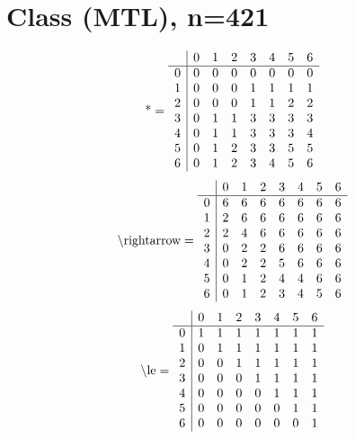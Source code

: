 \documentclass[11pt]{article}
\begin{document}
\section{Class (MTL), n=421}
\[\text{*} = 
\begin{array}{r | r r r r r r r}
 & 0 & 1 & 2 & 3 & 4 & 5 & 6 \\ \hline
0 & 0 & 0 & 0 & 0 & 0 & 0 & 0 \\
1 & 0 & 0 & 0 & 1 & 1 & 1 & 1 \\
2 & 0 & 0 & 0 & 1 & 1 & 2 & 2 \\
3 & 0 & 1 & 1 & 3 & 3 & 3 & 3 \\
4 & 0 & 1 & 1 & 3 & 3 & 3 & 4 \\
5 & 0 & 1 & 2 & 3 & 3 & 5 & 5 \\
6 & 0 & 1 & 2 & 3 & 4 & 5 & 6 \\
\end{array}
\]
\[\text{\textbackslash rightarrow} = 
\begin{array}{r | r r r r r r r}
 & 0 & 1 & 2 & 3 & 4 & 5 & 6 \\ \hline
0 & 6 & 6 & 6 & 6 & 6 & 6 & 6 \\
1 & 2 & 6 & 6 & 6 & 6 & 6 & 6 \\
2 & 2 & 4 & 6 & 6 & 6 & 6 & 6 \\
3 & 0 & 2 & 2 & 6 & 6 & 6 & 6 \\
4 & 0 & 2 & 2 & 5 & 6 & 6 & 6 \\
5 & 0 & 1 & 2 & 4 & 4 & 6 & 6 \\
6 & 0 & 1 & 2 & 3 & 4 & 5 & 6 \\
\end{array}
\]
\[\text{\textbackslash le} = 
\begin{array}{r | r r r r r r r}
 & 0 & 1 & 2 & 3 & 4 & 5 & 6 \\ \hline
0 & 1 & 1 & 1 & 1 & 1 & 1 & 1 \\
1 & 0 & 1 & 1 & 1 & 1 & 1 & 1 \\
2 & 0 & 0 & 1 & 1 & 1 & 1 & 1 \\
3 & 0 & 0 & 0 & 1 & 1 & 1 & 1 \\
4 & 0 & 0 & 0 & 0 & 1 & 1 & 1 \\
5 & 0 & 0 & 0 & 0 & 0 & 1 & 1 \\
6 & 0 & 0 & 0 & 0 & 0 & 0 & 1 \\
\end{array}
\]
\end{document}
